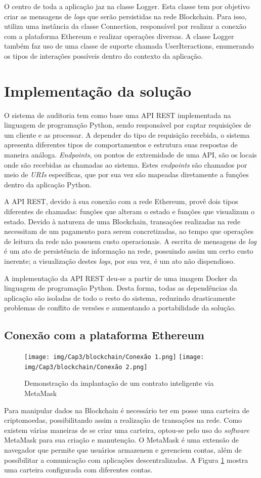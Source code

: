 O centro de toda a aplicação jaz na classe Logger. Esta classe tem por objetivo criar as mensagens de \emph{logs} que serão persistidas na rede Blockchain. Para isso, utiliza uma instância da classe Connection, responsável por realizar a conexão com a plataforma Ethereum e realizar operações diversas. A classe Logger também faz uso de uma classe de suporte chamada UserIteractions, enumerando os tipos de interações possíveis dentro do contexto da aplicação.


\section{Implementação da solução}
O sistema de auditoria tem como base uma API REST implementada na linguagem de programação Python, sendo responsável por captar requisições de um cliente e as processar. A depender do tipo de requisição recebida, o sistema apresenta diferentes tipos de comportamentos e estrutura suas respostas de maneira análoga. \emph{Endpoints}, ou pontos de extremidade de uma API, são os locais onde são recebidas as chamadas ao sistema. Estes \emph{endpoints} são chamados por meio de \emph{URIs} específicas, que por sua vez são mapeadas diretamente a funções dentro da aplicação Python.

A API REST, devido à sua conexão com a rede Ethereum, provê dois tipos diferentes de chamadas: funções que alteram o estado e funções que visualizam o estado. Devido à natureza de uma Blockchain, transações realizadas na rede necessitam de um pagamento para serem concretizadas, ao tempo que operações de leitura da rede não possuem custo operacionais. A escrita de mensagens de \emph{log} é um ato de persistência de informação na rede, possuindo assim um certo custo inerente; a visualização destes \emph{logs}, por sua vez, é um ato não dispendioso.

A implementação da API REST deu-se a partir de uma imagem Docker da linguagem de programação Python. Desta forma, todas as dependências da aplicação são isoladas de todo o resto do sistema, reduzindo drasticamente problemas de conflito de versões e aumentando a portabilidade da solução.

\subsection{Conexão com a plataforma Ethereum}
\begin{figure}
    \texttt{[image: img/Cap3/blockchain/Conexão 1.png]}
    \centering
    \texttt{[image: img/Cap3/blockchain/Conexão 2.png]}
    \caption{Demonstração da implantação de um contrato inteligente via MetaMask}
    \label{fig:smart_contract}
\end{figure}
Para manipular dados na Blockchain é necessário ter em posse uma carteira de criptomoedas, possibilitando assim a realização de transações na rede. Como existem várias maneiras de se criar uma carteira, optou-se pelo uso do \emph{software} MetaMask para sua criação e manutenção. O MetaMask é uma extensão de navegador que permite que usuários armazenem e gerenciem contas, além de possibilitar a comunicação com aplicações descentralizadas. A Figura \ref{fig:smart_contract} mostra uma carteira configurada com diferentes contas.

